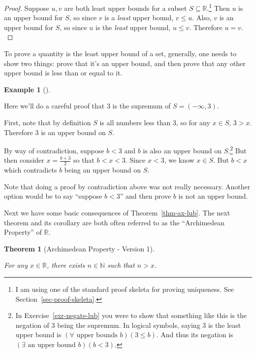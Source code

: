 \documentclass[
  letterpaper,
  DIV=11,
  numbers=noendperiod]{scrreprt}
\def\R{\mathbb R}
\def\N{\mathbb N}
\theoremstyle{plain}
\newtheorem{theorem}{Theorem}[chapter]
\theoremstyle{definition}
\theoremstyle{plain}
\theoremstyle{plain}
\theoremstyle{definition}
\newtheorem{example}{Example}[chapter]
\theoremstyle{definition}
\theoremstyle{remark}
\begin{document}
\begin{proof}
Suppose \(u,v\) are both least upper bounds for a subset
\(S\subseteq\R.\)\footnote{I am using one of the standard proof skeleta
  for proving uniqueness. See Section~\ref{sec-proof-skeleta}.} Then
\(u\) is an upper bound for \(S\), so since \(v\) is a \emph{least}
upper bound, \(v\leq u\). Also, \(v\) is an upper bound for \(S\), so
since \(u\) is the \emph{least} upper bound, \(u\leq v\). Therefore
\(u=v.\)
\end{proof}

To prove a quantity is the least upper bound of a set, generally, one
needs to show two things: prove that it's an upper bound, and then prove
that any other upper bound is less than or equal to it.

\begin{example}[]\protect\hypertarget{exm-sup-basic}{}\label{exm-sup-basic}

Here we'll do a careful proof that \(3\) is the supremum of
\(S=(-\infty,3)\).

First, note that by definition \(S\) is all numbers less than 3, so for
any \(x\in S\), \(3>x.\) Therefore \(3\) is an upper bound on \(S\).

By way of contradiction, suppose \(b<3\) and \(b\) is also an upper
bound on \(S\).\footnote{In Exercise~\ref{exr-negate-lub} you were to
  show that something like this is the negation of \(3\) being the
  supremum. In logical symbols, saying 3 is the least upper bound is
  \((\forall \text{ upper bounds } b)(3\leq b)\). And thus its negation
  is \((\exists\text{ an upper bound } b)(b<3)\).} But then consider
\(x=\frac{b+3}{2}\) so that \(b<x<3.\) Since \(x<3\), we know
\(x\in S.\) But \(b<x\) which contradicts \(b\) being an upper bound on
\(S\).

\end{example}

Note that doing a proof by contradiction above was not really necessary.
Another option would be to say ``suppose \(b<3\)'' and then prove \(b\)
is not an upper bound.

Next we have some basic consequences of Theorem~\ref{thm-ax-lub}. The
next theorem and its corollary are both often referred to as the
``Archimedean Property'' of \(\R\).

\begin{theorem}[Archimedean Property - Version
1]\protect\hypertarget{thm-arch-prop}{}\label{thm-arch-prop}

For any \(x\in\R\), there exists \(n\in\N\) such that \(n>x\).

\end{theorem}
\end{document}
